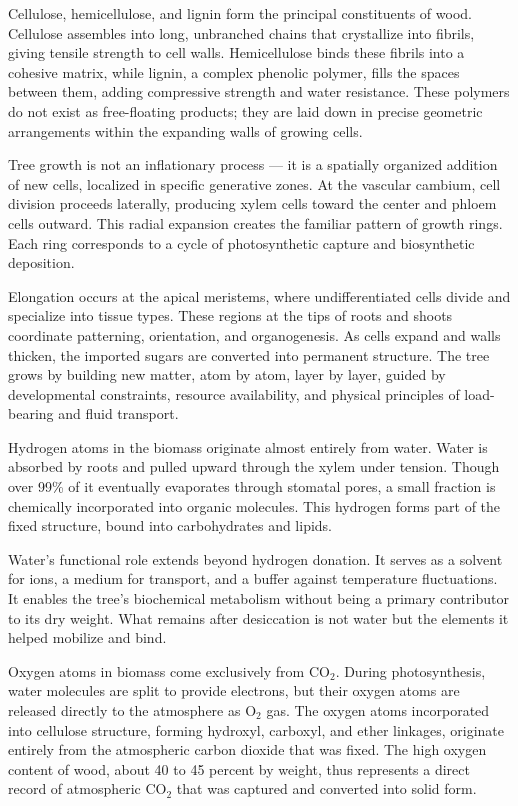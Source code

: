 Cellulose, hemicellulose, and lignin form the principal constituents of wood. Cellulose assembles into long, unbranched chains that crystallize into fibrils, giving tensile strength to cell walls. Hemicellulose binds these fibrils into a cohesive matrix, while lignin, a complex phenolic polymer, fills the spaces between them, adding compressive strength and water resistance. These polymers do not exist as free-floating products; they are laid down in precise geometric arrangements within the expanding walls of growing cells.

Tree growth is not an inflationary process — it is a spatially organized addition of new cells, localized in specific generative zones. At the vascular cambium, cell division proceeds laterally, producing xylem cells toward the center and phloem cells outward. This radial expansion creates the familiar pattern of growth rings. Each ring corresponds to a cycle of photosynthetic capture and biosynthetic deposition.

Elongation occurs at the apical meristems, where undifferentiated cells divide and specialize into tissue types. These regions at the tips of roots and shoots coordinate patterning, orientation, and organogenesis. As cells expand and walls thicken, the imported sugars are converted into permanent structure. The tree grows by building new matter, atom by atom, layer by layer, guided by developmental constraints, resource availability, and physical principles of load-bearing and fluid transport.

Hydrogen atoms in the biomass originate almost entirely from water. Water is absorbed by roots and pulled upward through the xylem under tension. Though over 99\% of it eventually evaporates through stomatal pores, a small fraction is chemically incorporated into organic molecules. This hydrogen forms part of the fixed structure, bound into carbohydrates and lipids.

Water's functional role extends beyond hydrogen donation. It serves as a solvent for ions, a medium for transport, and a buffer against temperature fluctuations. It enables the tree's biochemical metabolism without being a primary contributor to its dry weight. What remains after desiccation is not water but the elements it helped mobilize and bind.

Oxygen atoms in biomass come exclusively from \(\mathrm{CO}_2\). During photosynthesis, water molecules are split to provide electrons, but their oxygen atoms are released directly to the atmosphere as \(\mathrm{O}_2\) gas. The oxygen atoms incorporated into cellulose structure, forming hydroxyl, carboxyl, and ether linkages, originate entirely from the atmospheric carbon dioxide that was fixed. The high oxygen content of wood, about 40 to 45 percent by weight, thus represents a direct record of atmospheric \(\mathrm{CO}_2\) that was captured and converted into solid form.

